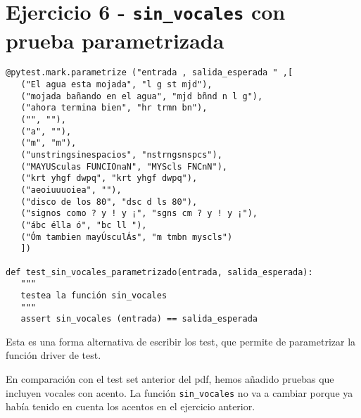 \newpage
\section{Ejercicio 6 - \texttt{sin\_vocales} con prueba parametrizada}

\begin{lstlisting}
@pytest.mark.parametrize ("entrada , salida_esperada " ,[
   ("El agua esta mojada", "l g st mjd"),
   ("mojada bañando en el agua", "mjd bñnd n l g"),
   ("ahora termina bien", "hr trmn bn"),
   ("", ""),
   ("a", ""),
   ("m", "m"),
   ("unstringsinespacios", "nstrngsnspcs"),
   ("MAYUSculas FUNCIOnaN", "MYScls FNCnN"),
   ("krt yhgf dwpq", "krt yhgf dwpq"),
   ("aeoiuuuoiea", ""),
   ("disco de los 80", "dsc d ls 80"),
   ("signos como ? y ! y ¡", "sgns cm ? y ! y ¡"),
   ("ábc élla ó", "bc ll "),
   ("Óm tambien mayÚsculÁs", "m tmbn myscls")
   ])

def test_sin_vocales_parametrizado(entrada, salida_esperada):
   """
   testea la función sin_vocales
   """
   assert sin_vocales (entrada) == salida_esperada
\end{lstlisting}

Esta es una forma alternativa de escribir los test, que permite de parametrizar la función driver de test.

En comparación con el test set anterior del pdf, hemos añadido pruebas que incluyen vocales con acento. La función \lstinline|sin_vocales| no va a cambiar porque ya había tenido en cuenta los acentos en el ejercicio anterior.



